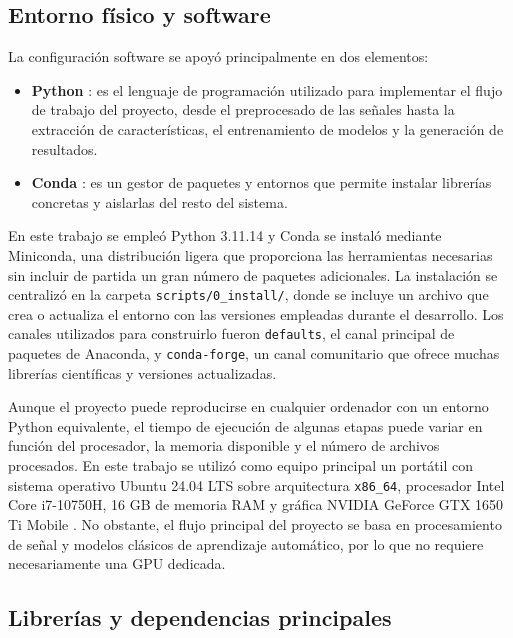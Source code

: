 \subsection{Entorno físico y software}

La configuración software se apoyó principalmente en dos elementos:

\begin{itemize}
    \item \textbf{Python} \cite{pythonDocs}: es el lenguaje de programación utilizado para implementar el flujo de trabajo del proyecto, desde el preprocesado de las señales hasta la extracción de características, el entrenamiento de modelos y la generación de resultados.
    \item \textbf{Conda} \cite{condaDocs}: es un gestor de paquetes y entornos que permite instalar librerías concretas y aislarlas del resto del sistema.
\end{itemize}

En este trabajo se empleó Python 3.11.14 y Conda se instaló mediante Miniconda, una distribución ligera que proporciona las herramientas necesarias sin incluir de partida un gran número de paquetes adicionales. La instalación se centralizó en la carpeta \texttt{scripts/0\_install/}, donde se incluye un archivo que crea o actualiza el entorno con las versiones empleadas durante el desarrollo. Los canales utilizados para construirlo fueron \texttt{defaults}, el canal principal de paquetes de Anaconda, y \texttt{conda-forge}, un canal comunitario que ofrece muchas librerías científicas y versiones actualizadas.

Aunque el proyecto puede reproducirse en cualquier ordenador con un entorno Python equivalente, el tiempo de ejecución de algunas etapas puede variar en función del procesador, la memoria disponible y el número de archivos procesados. En este trabajo se utilizó como equipo principal un portátil con sistema operativo Ubuntu 24.04 LTS \cite{ubuntuDocs} sobre arquitectura \texttt{x86\_64}, procesador Intel Core i7-10750H, 16 GB de memoria RAM y gráfica NVIDIA GeForce GTX 1650 Ti Mobile \cite{nvidiaDocs}. No obstante, el flujo principal del proyecto se basa en procesamiento de señal y modelos clásicos de aprendizaje automático, por lo que no requiere necesariamente una \ac{GPU} dedicada.

\subsection{Librerías y dependencias principales}

